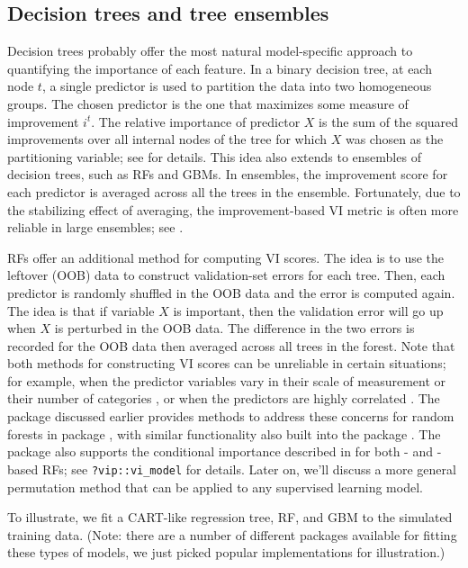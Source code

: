 \subsection{Decision trees and tree ensembles}

Decision trees probably offer the most natural model-specific approach
to quantifying the importance of each feature. In a binary decision
tree, at each node \(t\), a single predictor is used to partition the
data into two homogeneous groups. The chosen predictor is the one that
maximizes some measure of improvement \(i^t\). The relative importance
of predictor \(X\) is the sum of the squared improvements over all
internal nodes of the tree for which \(X\) was chosen as the
partitioning variable; see \citet{classification-breiman-1984} for
details. This idea also extends to ensembles of decision trees, such as
RFs and GBMs. In ensembles, the improvement score for each predictor is
averaged across all the trees in the ensemble. Fortunately, due to the
stabilizing effect of averaging, the improvement-based VI metric is
often more reliable in large ensembles; see
\citet[p. 368]{hastie-elements-2009}.

RFs offer an additional method for computing VI scores. The idea is to
use the leftover  (OOB) data to construct validation-set
errors for each tree. Then, each predictor is randomly shuffled in the
OOB data and the error is computed again. The idea is that if variable
\(X\) is important, then the validation error will go up when \(X\) is
perturbed in the OOB data. The difference in the two errors is recorded
for the OOB data then averaged across all trees in the forest. Note that
both methods for constructing VI scores can be unreliable in certain
situations; for example, when the predictor variables vary in their
scale of measurement or their number of categories \citep{party2007a},
or when the predictors are highly correlated
\citep{strobl-2019-conditional}. The  package discussed
earlier provides methods to address these concerns for random forests in
package , with similar functionality also built into the
 package \citep{R-partykit}. The  package
also supports the conditional importance described in
\citep{strobl-2019-conditional} for both - and
-based RFs; see \texttt{?vip::vi\_model} for details.
Later on, we'll discuss a more general permutation method that can be
applied to any supervised learning model.

To illustrate, we fit a CART-like regression tree, RF, and GBM to the
simulated training data. (Note: there are a number of different packages
available for fitting these types of models, we just picked popular
implementations for illustration.)

